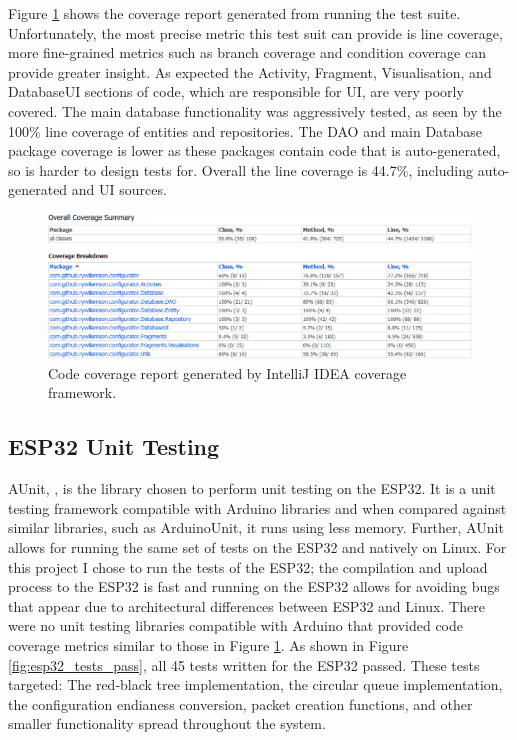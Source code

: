 \documentclass{l4proj}
\begin{document}
Figure \ref{fig:android_coverage} shows the coverage report generated from running the test suite. Unfortunately, the most precise metric this test suit can provide is line coverage, more fine-grained metrics such as branch coverage and condition coverage can provide greater insight. As expected the Activity, Fragment, Visualisation, and DatabaseUI sections of code, which are responsible for UI, are very poorly covered. The main database functionality was aggressively tested, as seen by the 100\% line coverage of entities and repositories. The DAO and main Database package coverage is lower as these packages contain code that is auto-generated, so is harder to design tests for. Overall the line coverage is 44.7\%, including auto-generated and UI sources.

\begin{figure}[!htb]
    \centering
    \includegraphics[width=1.0\linewidth]{images/android-code-coverage.png}

    \caption{ Code coverage report generated by IntelliJ IDEA coverage framework. }

    \label{fig:android_coverage}
\end{figure}

\subsection{ESP32 Unit Testing}

AUnit, \citep{park_bxparksaunit_2021}, is the library chosen to perform unit testing on the ESP32. It is a unit testing framework compatible with Arduino libraries and when compared against similar libraries, such as ArduinoUnit, it runs using less memory. Further, AUnit allows for running the same set of tests on the ESP32 and natively on Linux. For this project I chose to run the tests of the ESP32; the compilation and upload process to the ESP32 is fast and running on the ESP32 allows for avoiding bugs that appear due to architectural differences between ESP32 and Linux. There were no unit testing libraries compatible with Arduino that provided code coverage metrics similar to those in Figure \ref{fig:android_coverage}. As shown in Figure \ref{fig:esp32_tests_pass}, all 45 tests written for the ESP32 passed. These tests targeted: The red-black tree implementation, the circular queue implementation, the configuration endianess conversion, packet creation functions, and other smaller functionality spread throughout the system.
\end{document}

